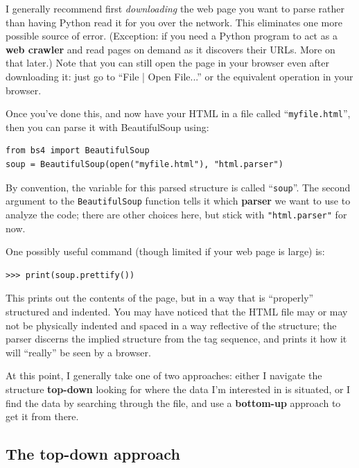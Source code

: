 I generally recommend first \textit{downloading} the web page you want to
parse rather than having Python read it for you over the network. This
eliminates one more possible source of error. (Exception: if you need a Python
program to act as a \textbf{web crawler} and read pages on demand as it
discovers their URLs. More on that later.) Note that you can still open the
page in your browser even after downloading it: just go to ``File | Open
File...'' or the equivalent operation in your browser.

Once you've done this, and now have your HTML in a file called
``\texttt{myfile.html}'', then you can parse it with BeautifulSoup using:

\begin{Verbatim}[fontsize=\small,samepage=true,frame=single]
from bs4 import BeautifulSoup
soup = BeautifulSoup(open("myfile.html"), "html.parser")
\end{Verbatim}

By convention, the variable for this parsed structure is called
``\texttt{soup}''. The second argument to the \texttt{BeautifulSoup} function
tells it which \textbf{parser} we want to use to analyze the code; there are
other choices here, but stick with \texttt{"html.parser"} for now.

One possibly useful command (though limited if your web page is large) is:

\begin{Verbatim}[fontsize=\small,samepage=true,frame=single]
>>> print(soup.prettify())
\end{Verbatim}

This prints out the contents of the page, but in a way that is ``properly''
structured and indented. You may have noticed that the HTML file may or may
not be physically indented and spaced in a way reflective of the structure;
the parser discerns the implied structure from the tag sequence, and prints it
how it will ``really'' be seen by a browser.

At this point, I generally take one of two approaches: either I navigate the
structure \textbf{top-down} looking for where the data I'm interested in is
situated, or I find the data by searching through the file, and use a
\textbf{bottom-up} approach to get it from there.

\subsection{The top-down approach}


